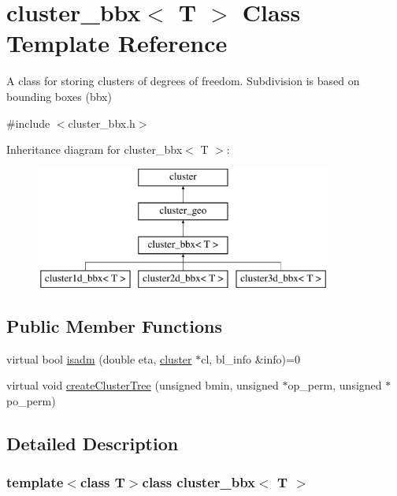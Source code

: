 \hypertarget{classcluster__bbx}{
\section{cluster\-\_\-bbx$<$ \-T $>$ \-Class \-Template \-Reference}
\label{classcluster__bbx}
}


\-A class for storing clusters of degrees of freedom. \-Subdivision is based on bounding boxes (bbx)  




{\ttfamily \#include $<$cluster\-\_\-bbx.\-h$>$}

\-Inheritance diagram for cluster\-\_\-bbx$<$ \-T $>$\-:\begin{figure}[H]
\begin{center}
\leavevmode
\includegraphics[height=4.000000cm]{classcluster__bbx}
\end{center}
\end{figure}
\subsection*{\-Public \-Member \-Functions}
\begin{DoxyCompactItemize}
\item 
virtual bool \hyperlink{classcluster__bbx_ab5852c7c8fb33c1b3a681c8f4b0eec10}{isadm} (double eta, \hyperlink{classcluster}{cluster} $\ast$cl, bl\-\_\-info \&info)=0
\item 
virtual void \hyperlink{classcluster__bbx_afa9ff45f3792189e25a46b8764f2da0c}{create\-Cluster\-Tree} (unsigned bmin, unsigned $\ast$op\-\_\-perm, unsigned $\ast$po\-\_\-perm)
\end{DoxyCompactItemize}


\subsection{\-Detailed \-Description}
\subsubsection*{template$<$class \-T$>$class cluster\-\_\-bbx$<$ T $>$}

